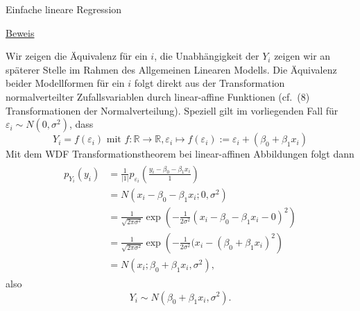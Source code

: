 \documentclass[
  8pt,
  ignorenonframetext,
]{beamer}
\begin{document}
\begin{frame}{Einfache lineare Regression}
\protect\hypertarget{einfache-lineare-regression-3}{}
\tiny
\setlength{\abovedisplayskip}{3pt}
\setlength{\belowdisplayskip}{3pt}

\underline{Beweis}

Wir zeigen die Äquivalenz für ein \(i\), die Unabhängigkeit der \(Y_i\)
zeigen wir an späterer Stelle im Rahmen des Allgemeinen Linearen
Modells. Die Äquivalenz beider Modellformen für ein \(i\) folgt direkt
aus der Transformation normalverteilter Zufallsvariablen durch
linear-affine Funktionen (cf.~(8) Transformationen der
Normalverteilung). Speziell gilt im vorliegenden Fall für
\(\varepsilon_i \sim N(0,\sigma^2)\), dass \begin{equation}
Y_i = f(\varepsilon_i)
\mbox{ mit }
f : \mathbb{R} \to \mathbb{R}, \varepsilon_i \mapsto f(\varepsilon_i) := \varepsilon_i + (\beta_0 + \beta_1x_i)
\end{equation} Mit dem WDF Transformationstheorem bei linear-affinen
Abbildungen folgt dann \begin{align}
\begin{split}
p_{Y_i}(y_i)
& = \frac{1}{|1|} p_{\varepsilon_i}\left(\frac{y_i - \beta_0 - \beta_1x_i}{1} \right)       \\
& = N\left(x_i - \beta_0 - \beta_1x_i; 0, \sigma^2\right)                                   \\
& = \frac{1}{\sqrt{2\pi\sigma^2}}\exp\left(-\frac{1}{2\sigma^2}(x_i - \beta_0 - \beta_1x_i - 0)^2 \right)    \\
& = \frac{1}{\sqrt{2\pi\sigma^2}}\exp\left(-\frac{1}{2\sigma^2}(x_i - (\beta_0 + \beta_1x_i)^2 \right)        \\
& = N\left(x_i; \beta_0 + \beta_1x_i,\sigma^2\right),
\end{split}
\end{align} also \begin{equation}
Y_i \sim N\left(\beta_0 + \beta_1x_i,\sigma^2\right).
\end{equation}
\end{frame}
\end{document}
